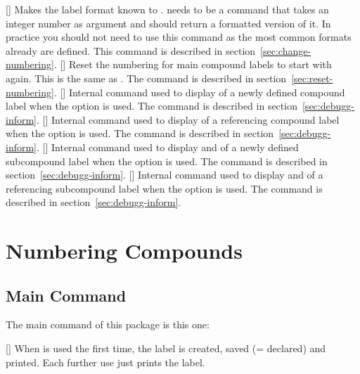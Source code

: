 \documentclass[load-preamble+,ngerman,british,american]{cnltx-doc}
\begin{document}
\begin{commands}
  []
    Makes the label format  known to \chemnum.  
    needs to be a command that takes an integer number as argument and should
    return a formatted version of it.  In practice you should not need to use
    this command as the most common formats already are defined.  This command
    is described in section~\ref{sec:change-numbering}.
  []
    Reset the numbering for main compound labels to start with 
    again.  This is the same as
    .  The
    command is described in section~\ref{sec:reset-numbering}.
  []
    Internal command used to display  of a newly defined compound
    label when the option  is used.  The command is
    described in section~\ref{sec:debugg-inform}.
  []
    Internal command used to display  of a referencing compound
    label when the option  is used.  The command is
    described in section~\ref{sec:debugg-inform}.
  []
    Internal command used to display  and  of a newly defined subcompound label when the option
     is used.  The command is described in
    section~\ref{sec:debugg-inform}.
  []
    Internal command used to display  and  of a referencing subcompound label when the option
     is used.  The command is described in
    section~\ref{sec:debugg-inform}.
\end{commands}

\section{Numbering Compounds}\label{sec:numbering-compounds}
\subsection{Main Command}\label{sec:main-command}\resetcmpd

The main command of this package is this one:
\begin{commands}
  []
    When  is used the first time, the label is created, saved
    (= declared) and printed.  Each further use just prints the label.
\end{commands}
\end{document}
